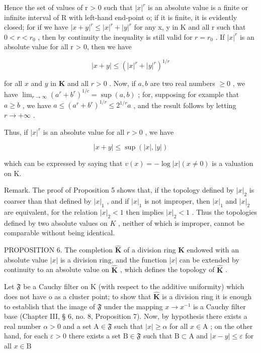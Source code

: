 Hence the set of values of r \textgreater{} 0 such that \(|x|^{r}\) is an absolute value is a finite or infinite interval of R with left-hand end-point o; if it is finite, it is evidently closed; for if we have \(|x + y|^{r} \leqslant |x|^{r} + |y|^{r}\) for any x, y in K and all r such that \(0 < r < r_{0}\) , then by continuity the inequality is still valid for \(r = r_{0}\) . If \(|x|^{r}\) is an absolute value for all r \textgreater{} 0, then we have

\[
| x + y | \leqslant (| x | ^ {r} + | y | ^ {r}) ^ {1 / r}
\]

for all \(x\) and \(y\) in \(\mathbf{K}\) and all \(r > 0\) . Now, if \(a, b\) are two real numbers \(\geqslant 0\) , we have \(\lim_{r \to \infty} (a^r + b^r)^{1/c} = \sup (a, b)\) ; for, supposing for example that \(a \geqslant b\) , we have \(a \leqslant (a^r + b^r)^{1/r} \leqslant 2^{1/r} a\) , and the result follows by letting \(r \to +\infty\) .

Thus, if \(|x|^r\) is an absolute value for all \(r > 0\) , we have

\[
| x + y | \leqslant \sup (| x |, | y |)
\]

which can be expressed by saying that \(v(x) = -\log |x| (x \neq 0)\) is a valuation on K.

Remark. The proof of Proposition 5 shows that, if the topology defined by \(|x|_2\) is coarser than that defined by \(|x|_1\) , and if \(|x|_1\) is not improper, then \(|x|_1\) and \(|x|_2\) are equivalent, for the relation \(|x|_2 < 1\) then implies \(|x|_2 < 1\) . Thus the topologies defined by two absolute values on \(K\) , neither of which is improper, cannot be comparable without being identical.

PROPOSITION 6. The completion \(\hat{\mathbf{K}}\) of a division ring \(\mathbf{K}\) endowed with an absolute value \(|x|\) is a division ring, and the function \(|x|\) can be extended by continuity to an absolute value on \(\hat{\mathbf{K}}\) , which defines the topology of \(\hat{\mathbf{K}}\) .

Let \(\mathfrak{F}\) be a Cauchy filter on K (with respect to the additive uniformity) which does not have o as a cluster point; to show that \(\hat{\mathbf{K}}\) is a division ring it is enough to establish that the image of \(\mathfrak{F}\) under the mapping \(x \to x^{-1}\) is a Cauchy filter base (Chapter III, § 6, no. 8, Proposition 7). Now, by hypothesis there exists a real number \(\alpha > 0\) and a set \(\mathrm{A} \in \mathfrak{F}\) such that \(|x| \geqslant \alpha\) for all \(x \in \mathrm{A}\) ; on the other hand, for each \(\varepsilon > 0\) there exists a set \(\mathrm{B} \in \mathfrak{F}\) such that \(\mathrm{B} \subset \mathrm{A}\) and \(|x - y| \leqslant \varepsilon\) for all \(x \in \mathrm{B}\)

